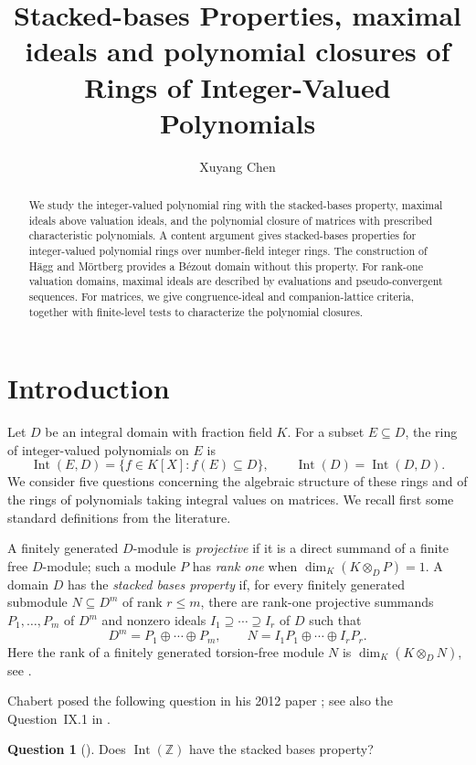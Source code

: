 \documentclass[11pt]{amsart}
\title[Algebraic properties of integer-valued polynomial rings]{Stacked-bases Properties, maximal ideals and polynomial closures of Rings of Integer-Valued Polynomials}
\author{Xuyang Chen}
\date{}
\theoremstyle{definition}
\newtheorem{question}[theorem]{Question}
\theoremstyle{remark}
\newcommand{\Int}{\operatorname{Int}}
\begin{document}
\begin{abstract}
We study the integer-valued polynomial ring with the stacked-bases property, maximal ideals above valuation
ideals, and the polynomial closure of matrices with prescribed
characteristic polynomials. A content argument gives stacked-bases
properties for integer-valued polynomial rings over number-field
integer rings. The construction of H\"agg and M\"ortberg provides a
B\'ezout domain without this property. For rank-one valuation domains,
maximal ideals are described by evaluations and pseudo-convergent
sequences. For matrices, we give congruence-ideal and companion-lattice
criteria, together with finite-level tests to characterize the polynomial closures.
\end{abstract}
\maketitle

\section{Introduction}
Let $D$ be an integral domain with fraction field $K$. For a subset
$E\subseteq D$, the ring of integer-valued polynomials on $E$ is
\[
 \Int(E,D)=\{f\in K[X]:f(E)\subseteq D\},\qquad
 \Int(D)=\Int(D,D).
\]
We consider five questions concerning the algebraic structure of these
rings and of the rings of polynomials taking integral values on matrices.
We recall first some standard definitions from the literature.

A finitely generated $D$-module is \emph{projective} if it is a direct
summand of a finite free $D$-module; such a module $P$ has \emph{rank one}
when $\dim_K(K\otimes_D P)=1$. A domain $D$ has the
\emph{stacked bases property} if, for every finitely generated submodule
$N\subseteq D^m$ of rank $r\leq m$, there are rank-one projective
summands $P_1,\ldots,P_m$ of $D^m$ and nonzero ideals
$I_1\supseteq\cdots\supseteq I_r$ of $D$ such that
\[
 D^m=P_1\oplus\cdots\oplus P_m,\qquad
 N=I_1P_1\oplus\cdots\oplus I_rP_r.
\]
Here the rank of a finitely generated torsion-free module $N$ is
$\dim_K(K\otimes_D N)$, see
\cite[Definition~IX.2]{Chabert2025}.

Chabert posed the following question in his 2012 paper
\cite{Chabert2012}; see also the
Question~IX.1 in \cite{Chabert2025}.
\begin{question}[\cite{Chabert2012}]\label{q:intz}
Does $\Int(\mathbb Z)$ have the stacked bases property?
\end{question}
\end{document}
